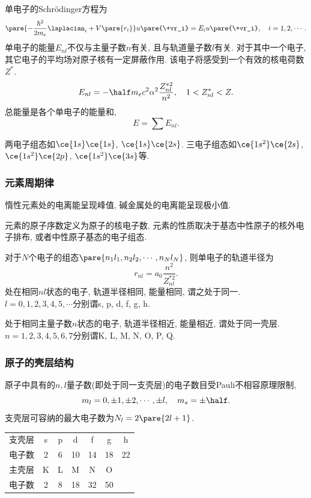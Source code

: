 \documentclass[hidelinks]{ctexart}
\begin{document}

\par
单电子的Schr\"odinger方程为
\[ \pare{-\frac{\hbar^2}{2m_e}\laplacian_i + V\pare{r_i}}u\pare{\+vr_i} = E_iu\pare{\+vr_i},\quad i = 1,2,\cdots. \]
单电子的能量$E_{nl}$不仅与主量子数$n$有关, 且与轨道量子数$l$有关. 对于其中一个电子, 其它电子的平均场对原子核有一定屏蔽作用. 该电子将感受到一个有效的核电荷数$Z^*$.
\[ E_{nl} = -\half m_e c^2\alpha^2 \frac{Z^{*2}_{nl}}{n^2},\quad 1<Z_{nl}^* < Z. \]
总能量是各个单电子的能量和,
\[ E = \sum E_{nl}. \]
\begin{ex}
    两电子组态如$\ce{1s}\ce{1s}$, $\ce{1s}\ce{2s}$. 三电子组态如$\ce{1s^2}\ce{2s}$, $\ce{1s^2}\ce{2p}$, $\ce{1s^2}\ce{3s}$等.
\end{ex}


\subsubsection{元素周期律} %
\label{ssub:元素周期律}

惰性元素处的电离能呈现峰值, 碱金属处的电离能呈现极小值.
\par
元素的原子序数定义为原子的核电子数. 元素的性质取决于基态中性原子的核外电子排布, 或者中性原子基态的电子组态.
\par
对于$N$个电子的组态$\pare{n_1l_1,n_2l_2,\cdots,n_Nl_N}$, 则单电子的轨道半径为
\[ r_{nl} = a_0 \frac{n^2}{Z_{nl}^{*2}}. \]
处在相同$nl$状态的电子, 轨道半径相同, 能量相同, 谓之处于同一. $l=0,1,2,3,4,5,\cdots$分别谓s, p, d, f, g, h.
\par
处于相同主量子数$n$状态的电子, 轨道半径相近, 能量相近, 谓处于同一壳层. $n=1,2,3,4,5,6,7$分别谓K, L, M, N, O, P, Q.


\subsubsection{原子的壳层结构} %
\label{ssub:原子的壳层结构}

原子中具有的$n,l$量子数(即处于同一支壳层)的电子数目受Pauli不相容原理限制,
\[ m_l = 0,\pm 1,\pm 2,\cdots,\pm l,\quad m_s = \pm \half. \]
支壳层可容纳的最大电子数为$N_l = 2\pare{2l+1}$.
\begin{center}
    \begin{tabular}{ccccccc}
        支壳层 & s & p & d & f & g & h \\
        电子数 & 2 & 6 & 10 & 14 & 18 & 22 \\
        主壳层 & K & L & M & N & O \\
        电子数 & 2 & 8 & 18 & 32 & 50
    \end{tabular}
\end{center}
\end{document}
